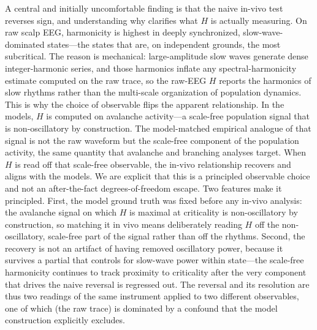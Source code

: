 \documentclass[11pt]{article}
\begin{document}
A central and initially uncomfortable finding is that the naive in-vivo test reverses sign, and understanding why clarifies what $H$ is actually measuring. On raw scalp EEG, harmonicity is highest in deeply synchronized, slow-wave-dominated states---the states that are, on independent grounds, the most subcritical. The reason is mechanical: large-amplitude slow waves generate dense integer-harmonic series, and those harmonics inflate any spectral-harmonicity estimate computed on the raw trace, so the raw-EEG $H$ reports the harmonics of slow rhythms rather than the multi-scale organization of population dynamics. This is why the choice of observable flips the apparent relationship. In the models, $H$ is computed on avalanche activity---a scale-free population signal that is non-oscillatory by construction. The model-matched empirical analogue of that signal is not the raw waveform but the scale-free component of the population activity, the same quantity that avalanche and branching analyses target. When $H$ is read off that scale-free observable, the in-vivo relationship recovers and aligns with the models. We are explicit that this is a principled observable choice and not an after-the-fact degrees-of-freedom escape. Two features make it principled. First, the model ground truth was fixed before any in-vivo analysis: the avalanche signal on which $H$ is maximal at criticality is non-oscillatory by construction, so matching it in vivo means deliberately reading $H$ off the non-oscillatory, scale-free part of the signal rather than off the rhythms. Second, the recovery is not an artifact of having removed oscillatory power, because it survives a partial that controls for slow-wave power within state---the scale-free harmonicity continues to track proximity to criticality after the very component that drives the naive reversal is regressed out. The reversal and its resolution are thus two readings of the same instrument applied to two different observables, one of which (the raw trace) is dominated by a confound that the model construction explicitly excludes.
\end{document}
